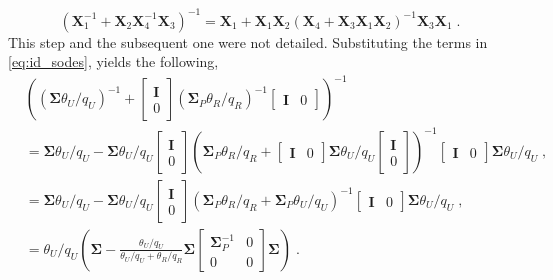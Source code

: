 \begin{equation}
	\left(\bm{X}^{-1}_1 + \bm{X}_2\bm{X}^{-1}_{4}\bm{X}_3\right)^{-1} = \bm{X}_1 + \bm{X}_1\bm{X}_2\left(\bm{X}_4 + \bm{X}_3\bm{X}_1\bm{X}_2\right)^{-1}\bm{X}_3\bm{X}_1\;.
	\label{eq:id_sodes}
\end{equation}
This step and the subsequent one were not detailed. Substituting the terms in \eqref{eq:id_sodes}, yields the following,
\begin{equation*}
	\begin{split}
		& \left(\left(\bm{\Sigma}\theta_U/q_U\right)^{-1}+\begin{bmatrix}
			\bm{I}\\
			0
		\end{bmatrix}
		\left(\bm{\Sigma}_P \theta_R/q_R\right)^{-1}\begin{bmatrix}
			\bm{I} & 0
		\end{bmatrix}\right)^{-1}\\ 
		&= \bm{\Sigma}\theta_U/q_U -\bm{\Sigma}\theta_U/q_U\begin{bmatrix}
			\bm{I}\\
			0
		\end{bmatrix}
		\left(\bm{\Sigma}_P \theta_R/q_R + \begin{bmatrix}
			\bm{I} & 0
		\end{bmatrix}
		\bm{\Sigma}\theta_U/q_U\begin{bmatrix}
			\bm{I}\\
			0
		\end{bmatrix}
		\right)^{-1}
		\begin{bmatrix}
			\bm{I} & 0
		\end{bmatrix}
		\bm{\Sigma}\theta_U/q_U\;,\\
		&= \bm{\Sigma}\theta_U/q_U - \bm{\Sigma}\theta_U/q_U\begin{bmatrix}
			\bm{I}\\
			0
		\end{bmatrix}
		\left(\bm{\Sigma}_P \theta_R/q_R + \bm{\Sigma}_P\theta_U/q_U\right)^{-1}\begin{bmatrix}
			\bm{I} & 0
		\end{bmatrix}
		\bm{\Sigma}\theta_U/q_U\;,\\
		&= \theta_U/q_U\left(\bm{\Sigma} - \frac{\theta_U/q_U}{\theta_U/q_U + \theta_R/q_R}\bm{\Sigma}\begin{bmatrix}
			\bm{\Sigma}^{-1}_{P} & 0\\
			0 & 0
		\end{bmatrix}
		\bm{\Sigma}
		\right)\;.
	\end{split}
\end{equation*}
